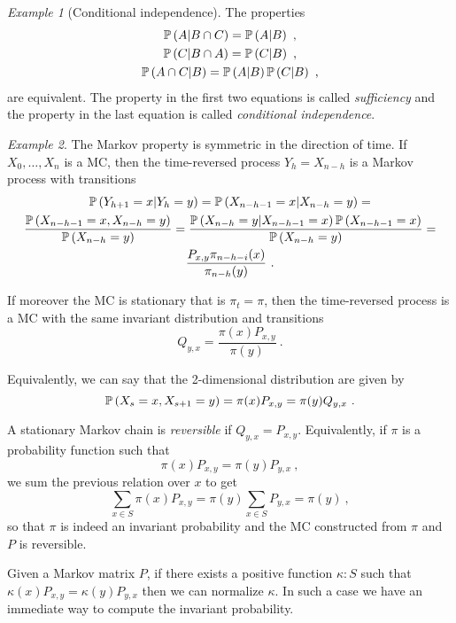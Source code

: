 \documentclass[12pt,a4paper]{amsart}
\theoremstyle{plain}%
\theoremstyle{definition}
\theoremstyle{remark}
\newtheorem{example}{Example}
\begin{document}
\begin{example}[Conditional independence]
The properties
\begin{gather*}
  \operatorname{\mathbb P}\left(A \middle| B \cap C\right) = \operatorname{\mathbb P}\left(A \middle| B\right) \ , \\
  \operatorname{\mathbb P}\left(C \middle| B \cap A\right) = \operatorname{\mathbb P}\left(C \middle| B\right) \ , \\
  \operatorname{\mathbb P}\left(A \cap C \middle| B\right) = \operatorname{\mathbb P}\left(A \middle| B\right) \operatorname{\mathbb P}\left(C \middle| B\right) \ ,
\end{gather*}
are equivalent. The property in the first two equations is called \emph{sufficiency} and the property in the last equation is called \emph{conditional independence}.
\end{example}
\begin{example}
The Markov property is symmetric in the direction of time. If $X_0,\dots,X_n$ is a MC, then the time-reversed process $Y_h = X_{n-h}$ is a Markov process with transitions
\begin{multline*}
  \operatorname{\mathbb P}\left(Y_{h+1}=x \middle| Y_{h}=y\right) = \operatorname{\mathbb P}\left(X_{n-h-1}=x \middle| X_{n-h}=y\right) = \\ \frac{\operatorname{\mathbb P}\left(X_{n-h-1}=x,X_{n-h}=y\right)}{\operatorname{\mathbb P}\left(X_{n-h}=y\right)} = \frac{\operatorname{\mathbb P}\left(X_{n-h}=y \middle| X_{n-h-1}=x\right)\operatorname{\mathbb P}\left(X_{n-h-1}=x\right)}{\operatorname{\mathbb P}\left(X_{n-h}=y\right)} = \\ \frac{P_{x,y}\pi_{n-h-i}(x)}{\pi_{n-h}(y)} \ .
\end{multline*}

If moreover the MC is stationary that is $\pi_t=\pi$, then the time-reversed process is a MC with the same invariant distribution and transitions
\begin{equation*}
  Q_{y,x} = \frac{ \pi(x) P_{x,y}}{\pi(y)} \ .
\end{equation*}

Equivalently, we can say that the 2-dimensional distribution are given by 
\begin{equation*}
  \operatorname{\mathbb P}\left(X_s=x,X_{s+1}=y\right) = \pi(x)P_{x,y} = \pi(y)Q_{y,x} \ .
\end{equation*}

A stationary Markov chain is \emph{reversible} if $Q_{y,x} = P_{x,y}$. Equivalently, if $\pi$ is a probability function such that
\begin{equation*}
 \pi(x)P_{x,y} = \pi(y)P_{y,x} \ , 
\end{equation*}
we sum the previous relation over $x$ to get
\begin{equation*}
  \sum_{x \in S} \pi(x)P_{x,y} = \pi(y) \sum_{x\in S} P_{y,x} = \pi(y) \ ,
\end{equation*}
so that $\pi$ is indeed an invariant probability and the MC constructed from $\pi$ and $P$ is reversible.

Given a Markov matrix $P$, if there exists a positive function $\kappa \colon S$ such that $\kappa(x)P_{x,y} = \kappa(y)P_{y,x}$ then we can normalize $\kappa$. In such a case we have an immediate way to compute the invariant probability.
\end{example}
\end{document}
